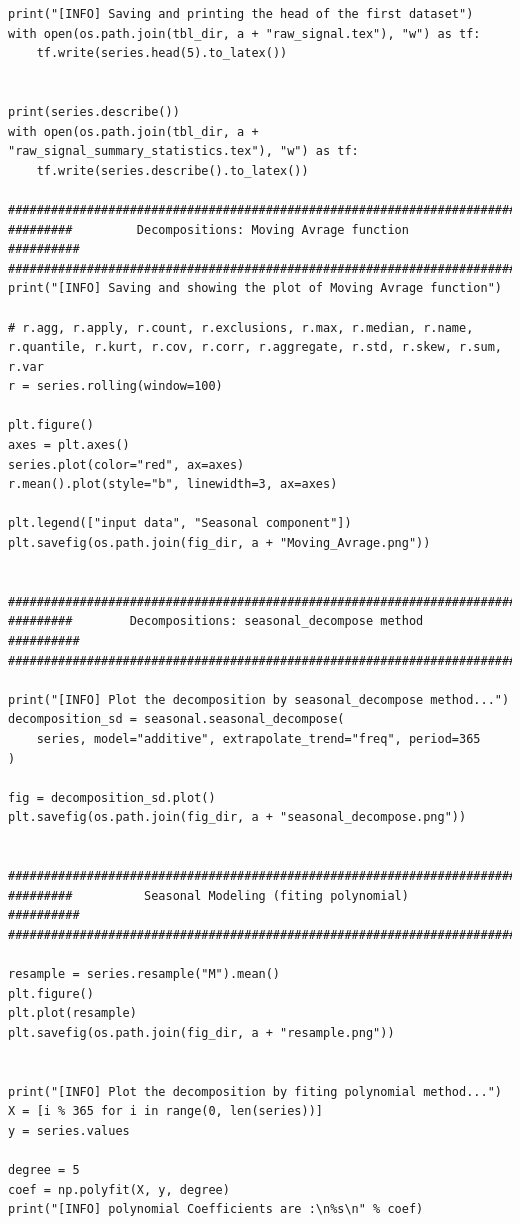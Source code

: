 \documentclass[12pt]{article}
\begin{document}
\begin{lstlisting}
print("[INFO] Saving and printing the head of the first dataset")
with open(os.path.join(tbl_dir, a + "raw_signal.tex"), "w") as tf:
    tf.write(series.head(5).to_latex())


print(series.describe())
with open(os.path.join(tbl_dir, a + "raw_signal_summary_statistics.tex"), "w") as tf:
    tf.write(series.describe().to_latex())

############################################################################
#########         Decompositions: Moving Avrage function          ##########
############################################################################
print("[INFO] Saving and showing the plot of Moving Avrage function")

# r.agg, r.apply, r.count, r.exclusions, r.max, r.median, r.name, r.quantile, r.kurt, r.cov, r.corr, r.aggregate, r.std, r.skew, r.sum, r.var
r = series.rolling(window=100)

plt.figure()
axes = plt.axes()
series.plot(color="red", ax=axes)
r.mean().plot(style="b", linewidth=3, ax=axes)

plt.legend(["input data", "Seasonal component"])
plt.savefig(os.path.join(fig_dir, a + "Moving_Avrage.png"))


############################################################################
#########        Decompositions: seasonal_decompose method        ##########
############################################################################

print("[INFO] Plot the decomposition by seasonal_decompose method...")
decomposition_sd = seasonal.seasonal_decompose(
    series, model="additive", extrapolate_trend="freq", period=365
)

fig = decomposition_sd.plot()
plt.savefig(os.path.join(fig_dir, a + "seasonal_decompose.png"))


############################################################################
#########          Seasonal Modeling (fiting polynomial)          ##########
############################################################################

resample = series.resample("M").mean()
plt.figure()
plt.plot(resample)
plt.savefig(os.path.join(fig_dir, a + "resample.png"))


print("[INFO] Plot the decomposition by fiting polynomial method...")
X = [i % 365 for i in range(0, len(series))]
y = series.values

degree = 5
coef = np.polyfit(X, y, degree)
print("[INFO] polynomial Coefficients are :\n%s\n" % coef)



\end{lstlisting}
\end{document}
